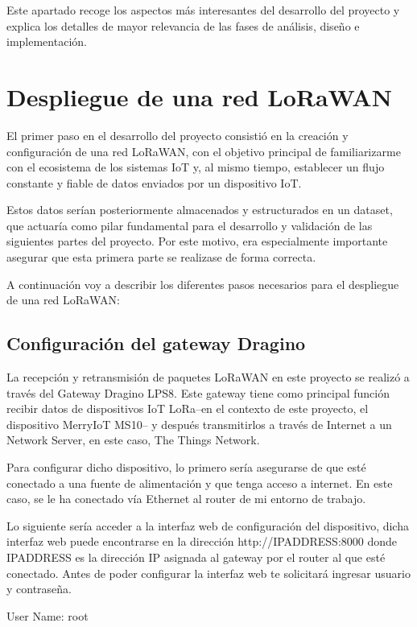 
Este apartado recoge los aspectos más interesantes del desarrollo del proyecto y explica los detalles de mayor relevancia de las fases de análisis, diseño e implementación.

\section{Despliegue de una red LoRaWAN}
El primer paso en el desarrollo del proyecto consistió en la creación y configuración de una red LoRaWAN, con el objetivo principal de familiarizarme con el ecosistema de los sistemas IoT y, al mismo tiempo, establecer un flujo constante y fiable de datos enviados por un dispositivo IoT.

Estos datos serían posteriormente almacenados y estructurados en un dataset, que actuaría como pilar fundamental para el desarrollo y validación de las siguientes partes del proyecto. Por este motivo, era especialmente importante asegurar que esta primera parte se realizase de forma correcta.

A continuación voy a describir los diferentes pasos necesarios para el despliegue de una red LoRaWAN:

\subsection{Configuración del gateway Dragino}
La recepción y retransmisión de paquetes LoRaWAN en este proyecto se realizó a través del Gateway Dragino LPS8. Este gateway tiene como principal función recibir datos de dispositivos IoT LoRa--en el contexto de este proyecto, el dispositivo MerryIoT MS10-- y después transmitirlos a través de Internet a un Network Server, en este caso, The Things Network.

Para configurar dicho dispositivo, lo primero sería asegurarse de que esté conectado a una fuente de alimentación y que tenga acceso a internet. En este caso, se le ha conectado vía Ethernet al router de mi entorno de trabajo.

Lo siguiente sería acceder a la interfaz web de configuración del dispositivo, dicha interfaz web puede encontrarse en la dirección http://IPADDRESS:8000 donde IPADDRESS es la dirección IP asignada al gateway por el router al que esté conectado. Antes de poder configurar la interfaz web te solicitará ingresar usuario y contraseña.

User Name: root


